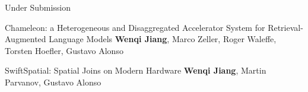 

\begin{rSection}{Under Submission}
\begin{enumerate}[label={[\arabic*]}]

\item 
\begin{Pub}{Chameleon: a Heterogeneous and Disaggregated Accelerator System for Retrieval-Augmented Language Models}
{\textbf{Wenqi Jiang}, Marco Zeller, Roger Waleffe, Torsten Hoefler, Gustavo Alonso}
{}
\end{Pub}

\item 
\begin{Pub}{SwiftSpatial: Spatial Joins on Modern Hardware}
{\textbf{Wenqi Jiang}, Martin Parvanov, Gustavo Alonso}
{}
\end{Pub}\end{enumerate}
\end{rSection}



